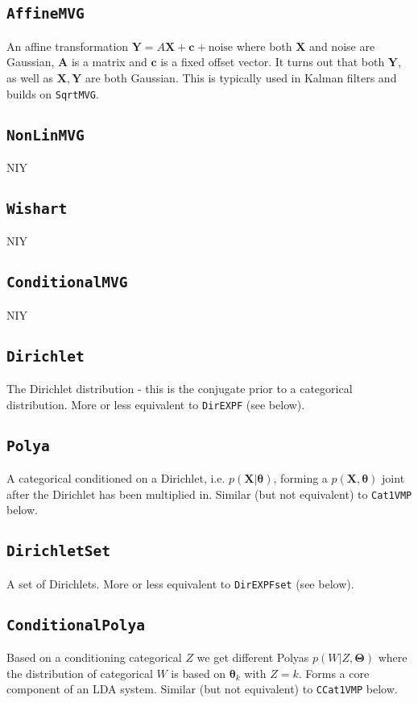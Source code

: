 \documentclass[english]{article}
\begin{document}
\subsection{\texttt{AffineMVG}} \label{ssec:AMVG}
An affine transformation $\bm{Y} = A\bm{X} + \bm{c} + \text{noise}$
where both $\bm{X}$ and noise are Gaussian, $\bm{A}$ is a matrix and
$\bm{c}$ is a fixed offset vector. It turns out that both $\bm{Y}$, as
well as $\bm{X},\bm{Y}$ are both Gaussian. This is typically used in
Kalman filters and builds on \texttt{SqrtMVG}.

\subsection{\texttt{NonLinMVG}} \label{ssec:NLMVG}
NIY

\subsection{\texttt{Wishart}} \label{ssec:NLMVG}
NIY

\subsection{\texttt{ConditionalMVG}} \label{ssec:CondMVG}
NIY

\subsection{\texttt{Dirichlet}}
The Dirichlet distribution - this is the conjugate prior to a
categorical distribution. More or less equivalent to \texttt{DirEXPF}
(see below).

\subsection{\texttt{Polya}}
A categorical conditioned on a Dirichlet,
i.e. $p(\bm{X}|\bm{\theta})$, forming a $p(\bm{X},\bm{\theta})$ joint
after the Dirichlet has been multiplied in. Similar (but not
equivalent) to \texttt{Cat1VMP} below.

\subsection{\texttt{DirichletSet}}
A set of Dirichlets. More or less equivalent to \texttt{DirEXPFset}
(see below).

\subsection{\texttt{ConditionalPolya}}
Based on a conditioning categorical $Z$ we get different Polyas
$p(W|Z,\bm{\Theta})$ where the distribution of categorical $W$ is
based on $\bm{\theta}_k$ with $Z=k$. Forms a core component of an LDA
system. Similar (but not equivalent) to \texttt{CCat1VMP} below.
\end{document}
